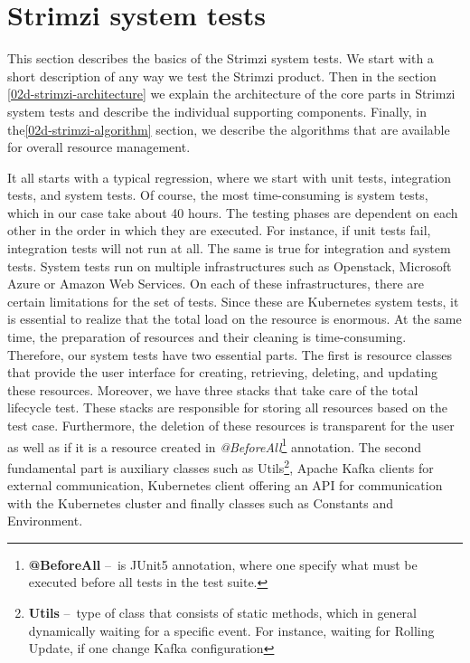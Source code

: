 \section{Strimzi system tests}
\label{02:sec:strimzisystemtests}

This section describes the basics of the Strimzi system tests.
We start with a short description of any way we test the Strimzi product.
Then in the section \ref{02d-strimzi-architecture} we explain the architecture of the core parts in Strimzi system tests and describe the individual supporting components. Finally, in the\ref{02d-strimzi-algorithm} section, we describe the algorithms that are available for overall resource management.

It all starts with a typical regression, where we start with unit tests, integration tests, and system tests. Of course, the most time-consuming is system tests, which in our case take about 40 hours. The testing phases are dependent on each other in the order in which they are executed. For instance, if unit tests fail, integration tests will not run at all. The same is true for integration and system tests. System tests run on multiple infrastructures such as Openstack, Microsoft Azure or Amazon Web Services. On each of these infrastructures, there are certain limitations for the set of tests. Since these are Kubernetes system tests, it is essential to realize that the total load on the resource is enormous. At the same time, the preparation of resources and their cleaning is time-consuming. Therefore, our system tests have two essential parts. The first is resource classes that provide the user interface for creating, retrieving, deleting, and updating these resources. Moreover, we have three stacks that take care of the total lifecycle test. These stacks are responsible for storing all resources based on the test case. Furthermore, the deletion of these resources is transparent for the user as well as if it is a resource created in \emph{@BeforeAll}\footnote{\textbf{@BeforeAll } \---\ is JUnit5 annotation, where one specify what must be executed before all tests in the test suite.} annotation. The second fundamental part is auxiliary classes such as Utils\footnote{\textbf{Utils} \---\ type of class that consists of static methods, which in general dynamically waiting for a specific event. For instance, waiting for Rolling Update, if one change Kafka configuration}, Apache Kafka clients for external communication, Kubernetes client offering an API for communication with the Kubernetes cluster and finally classes such as Constants and Environment.

